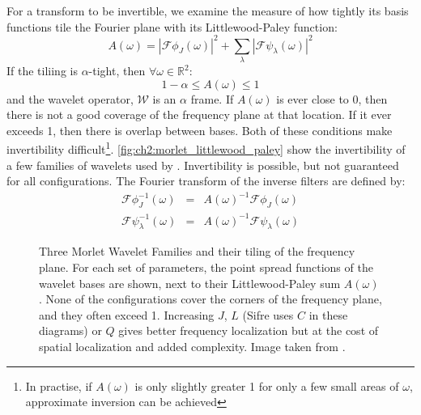   For a transform to be invertible, we examine the measure of how tightly its
  basis functions tile the Fourier plane with its Littlewood-Paley function:  
  \begin{equation}
    A(\omega) = {|\mathcal{F}\phi_J(\omega)|}^2
    + \sum_{\lambda} {|\mathcal{F}\psi_{\lambda}(\omega)|}^2
  \end{equation}
  If the tiliing is $\alpha$-tight, then $\forall \omega \in \mathbb{R}^2$:
  \begin{equation}
    1-\alpha \le A(\omega) \le 1
  \end{equation}
  and the wavelet operator, $\mathcal{W}$ is an $\alpha$ frame. If $A(\omega)$
  is ever close to 0, then there is not a good coverage of the frequency plane
  at that location. If it ever exceeds 1, then there is overlap between bases.
  Both of these conditions make invertibility difficult\footnote{In practise,
  if $A(\omega)$ is only slightly greater 1 for only a few small areas of
  $\omega$, approximate inversion can be achieved}.
  \autoref{fig:ch2:morlet_littlewood_paley} show the invertibility of a few
  families of wavelets used by \Mallat. Invertibility is possible, but not
  guaranteed for all configurations. The Fourier transform of the inverse
  filters are defined by:
  \begin{eqnarray}
    \mathcal{F}\phi_J^{-1}(\omega) &=& A(\omega)^{-1} \mathcal{F}\phi_J(\omega) \\
    \mathcal{F}\psi_{\lambda}^{-1}(\omega) &=& A(\omega)^{-1}
      \mathcal{F}\psi_{\lambda}(\omega) 
  \end{eqnarray}

  \begin{figure}
    \centering
      \makebox[\textwidth][c]{%
      }
      \caption[Three Morlet Wavelet Families and their tiling of the frequency
              plane]
              {Three Morlet Wavelet Families and their tiling of the frequency
              plane. For each set of parameters, the point spread functions of
              the wavelet bases are shown, next to their Littlewood-Paley sum
              $A(\omega)$. None of the configurations cover the corners of the
              frequency plane, and they often exceed 1. 
              Increasing $J$, $L$ (Sifre uses $C$ in these
              diagrams) or $Q$ gives better frequency localization but at the
              cost of spatial localization and added complexity. Image taken
              from \citep{sifre_rigid-motion_2014-1}.}
      \label{fig:ch2:morlet_littlewood_paley}
  \end{figure}



